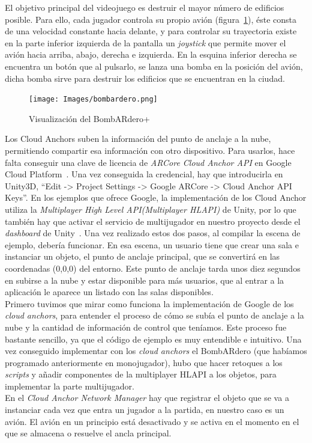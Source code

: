 El objetivo principal del videojuego es destruir el mayor número de edificios posible. Para ello, cada jugador controla su propio avión (figura~\ref{Bombardero}), éste consta de una velocidad constante hacia delante, y para controlar su trayectoria existe en la parte inferior izquierda de la pantalla un \textit{joystick} que permite mover el avión hacia arriba, abajo, derecha e izquierda. En la esquina inferior derecha se encuentra un botón que al pulsarlo, se lanza una bomba en la posición del avión, dicha bomba sirve para destruir los edificios que se encuentran en la ciudad.\\ 

\begin{figure}[H]
    \centering
    \texttt{[image: Images/bombardero.png]}
    \caption{Visualización del BombARdero+}
    \label{Bombardero}
\end{figure}

Los Cloud Anchors suben la información del punto de anclaje a la nube, permitiendo compartir esa información con otro dispositivo. Para usarlos, hace falta conseguir una clave de licencia de \textit{ARCore Cloud Anchor API} en Google Cloud Platform~\cite{GCloud}. Una vez conseguida la credencial, hay que introducirla en Unity3D, ``Edit -> Project Settings -> Google ARCore -> Cloud Anchor API Keys''. En los ejemplos que ofrece Google, la implementación de los Cloud Anchor utiliza la \textit{Multiplayer High Level API(Multiplayer HLAPI)} de Unity, por lo que también hay que activar el servicio de multijugador en nuestro proyecto desde el \textit{dashboard} de Unity~\cite{UnityDashboard}. Una vez realizado estos dos pasos, al compilar la escena de ejemplo, debería funcionar. En esa escena, un usuario tiene que crear una sala e instanciar un objeto, el punto de anclaje principal, que se convertirá en las coordenadas (0,0,0) del entorno.
Este punto de anclaje tarda unos diez segundos en subirse a la nube y estar disponible para más usuarios, que al entrar a la aplicación le aparece un listado con las salas disponibles.\\

 Primero tuvimos que mirar como funciona la implementación de Google de los \textit{cloud anchors}, para entender el proceso de cómo se subía el punto de anclaje a la nube y la cantidad de información de control que teníamos. Este proceso fue bastante sencillo, ya que el código de ejemplo es muy entendible e intuitivo. Una vez conseguido implementar con los \textit{cloud anchors} el BombARdero (que habíamos programado anteriormente en monojugador), hubo que hacer retoques a los \textit{scripts} y añadir componentes de la multiplayer HLAPI a los objetos, para implementar la parte multijugador.\\

En el \textit{Cloud Anchor Network Manager} hay que registrar el objeto que se va a instanciar cada vez que entra un jugador a la partida, en nuestro caso es un avión. El avión en un principio está desactivado y se activa en el momento en el que se almacena o resuelve el ancla principal.\\

\clearpage
\noindent